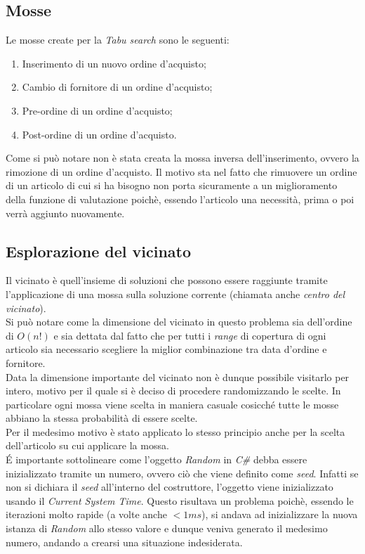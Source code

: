 \subsection{Mosse}
\label{sec:mosse}
\noindent Le mosse create per la \textit{Tabu search} sono le seguenti:
\begin{enumerate}
    \item Inserimento di un nuovo ordine d'acquisto;
    \item Cambio di fornitore di un ordine d'acquisto;
    \item Pre-ordine di un ordine d'acquisto;
    \item Post-ordine di un ordine d'acquisto.
\end{enumerate}
Come si può notare non è stata creata la mossa inversa dell'inserimento, ovvero la rimozione di un ordine d'acquisto.
Il motivo sta nel fatto che rimuovere un ordine di un articolo di cui si ha bisogno non porta sicuramente a un miglioramento
della funzione di valutazione poichè, essendo l'articolo una necessità, prima o poi verrà aggiunto nuovamente.

\subsection{Esplorazione del vicinato}
\label{sec:esplorazione-vicinato}
\noindent Il vicinato è quell'insieme di soluzioni che possono essere raggiunte
tramite l'applicazione di una mossa sulla soluzione corrente (chiamata anche \textit{centro del vicinato}).\\
Si può notare come la dimensione del vicinato in questo problema sia dell'ordine di $O(n!)$ e sia dettata dal fatto che
per tutti i \textit{range} di copertura di ogni articolo sia necessario scegliere la miglior
combinazione tra data d'ordine e fornitore.\\
Data la dimensione importante del vicinato non è dunque possibile visitarlo per intero,
motivo per il quale si è deciso di procedere randomizzando le scelte.
In particolare ogni mossa viene scelta in maniera casuale cosicché tutte le mosse
abbiano la stessa probabilità di essere scelte.\\
Per il medesimo motivo è stato applicato lo stesso principio anche per la scelta dell'articolo su cui applicare
la mossa.\\
É importante sottolineare come l'oggetto \textit{Random} in \textit{C\#}
debba essere inizializzato tramite un numero, ovvero
ciò che viene definito come \textit{seed}. Infatti se non si dichiara
il \textit{seed} all'interno del costruttore, l'oggetto viene inizializzato usando il
\textit{Current System Time}. Questo risultava un problema poichè, essendo le
iterazioni molto rapide (a volte anche $<1ms$), si andava ad inizializzare la nuova istanza
di \textit{Random} allo stesso valore e dunque veniva generato il medesimo
numero, andando a crearsi una situazione indesiderata.


